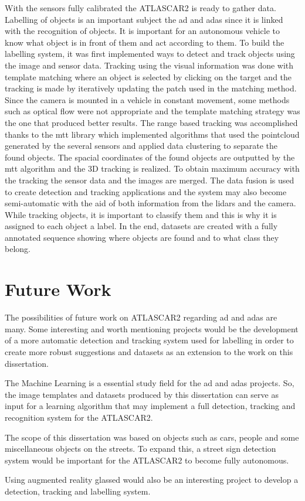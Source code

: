 With the sensors fully calibrated the ATLASCAR2 is ready to gather data. Labelling of objects is an important subject the \gls{ad} and \gls{adas} since it is linked with the recognition of objects. It is important for an autonomous vehicle to know what object is in front of them and act according to them. To build the labelling system, it was first implemented ways to detect and track objects using the image and sensor data. Tracking using the visual information was done with template matching where an object is selected by clicking on the target and the tracking is made by iteratively updating the patch used in the matching method. Since the camera is mounted in a vehicle in constant movement, some methods such as optical flow were not appropriate and the template matching strategy was the one that produced better results. The range based tracking was accomplished thanks to the \gls{mtt} library which implemented algorithms that used the pointcloud generated by the several sensors and applied data clustering to separate the found objects. The spacial coordinates of the found objects are outputted by the \gls{mtt} algorithm and the 3D tracking is realized. To obtain maximum accuracy with the tracking the sensor data and the images are merged. The data fusion is used to create detection and tracking applications and the system may also become semi-automatic with the aid of both information from the \gls{lidar}s and the camera. While tracking objects, it is important to classify them and this is why it is assigned to each object a label. In the end, datasets are created with a fully annotated sequence showing where objects are found and to what class they belong. 

\section{Future Work}

The possibilities of future work on ATLASCAR2 regarding \gls{ad} and \gls{adas} are many. Some interesting and worth mentioning projects would be the development of a more automatic detection and tracking system used for labelling in order to create more robust suggestions and datasets as an extension to the work on this dissertation. 

The Machine Learning is a essential study field for the \gls{ad} and \gls{adas} projects. So, the image templates and datasets produced by this dissertation can serve as input for a learning algorithm that may implement a full detection, tracking and recognition system for the ATLASCAR2.

The scope of this dissertation was based on objects such as cars, people and some miscellaneous objects on the streets. To expand this, a street sign detection system would be important for the ATLASCAR2 to become fully autonomous.

Using augmented reality glassed would also be an interesting project to develop a detection, tracking and labelling system.

